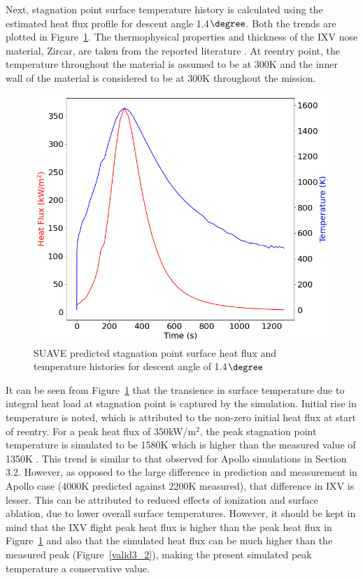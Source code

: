 \documentclass[%
 aip,
 amsmath,amssymb,
preprint,%
]{revtex4-1}
\begin{document}
Next, stagnation point surface temperature history is calculated using the estimated heat flux profile for descent angle 1.4$\degree$.  Both the trends are plotted in Figure~\ref{surf_therm}. The thermophysical properties and thickness of the IXV nose material, Zircar, are taken from the reported literature \cite{Massimo2008}. At reentry point, the temperature throughout the material is assumed to be at 300K and the inner wall of the material is considered to be at 300K throughout the mission.

\begin{figure}[h!]
\centering
\includegraphics[width=0.7\linewidth]{IXV_stag_thermal.png}
\caption{SUAVE predicted stagnation point surface heat flux and temperature histories for descent angle of 1.4$\degree$}
\label{surf_therm}
\end{figure}
It can be seen from Figure~\ref{surf_therm} that the transience in surface temperature due to integral heat load at stagnation point is captured by the simulation. Initial rise in temperature is noted, which is attributed to the non-zero initial heat flux at start of reentry. For a peak heat flux of 350kW/m$^{2}$, the peak stagnation point temperature is simulated to be 1580K which is higher than the measured value of 1350K \cite{buffenoir2017ixv}. This trend is similar to that observed for Apollo simulations in Section 3.2. However, as opposed to the large difference in prediction and measurement in Apollo case (4000K predicted against 2200K measured), that difference in IXV is lesser. This can be attributed to reduced effects of ionization and surface ablation, due to lower overall surface temperatures. However, it should be kept in mind that the IXV flight peak heat flux is higher than the peak heat flux in Figure~\ref{surf_therm} and also that the simulated heat flux can be much higher than the measured peak (Figure~\ref{valid3_2}), making the present simulated peak temperature a conservative value.
\end{document}

